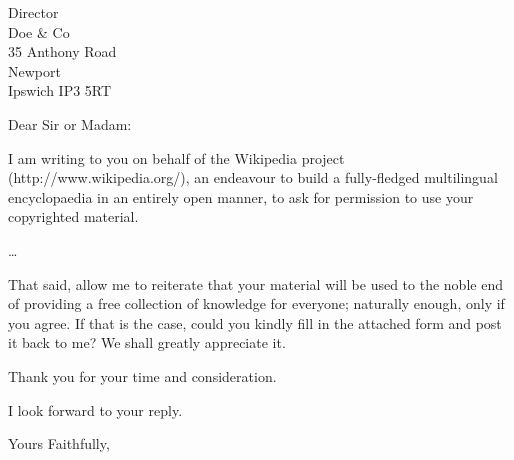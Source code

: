 \documentclass{letter}
\begin{document}
\begin{letter}{Director \\ Doe \& Co \\ 35 Anthony Road
\\ Newport \\ Ipswich IP3 5RT}
\opening{Dear Sir or Madam:}

I am writing to you on behalf of the Wikipedia project (http://www.wikipedia.org/),
an endeavour to build a fully-fledged multilingual encyclopaedia in an entirely
open manner, to ask for permission to use your copyrighted material.

\ldots 

That said, allow me to reiterate that your material will be used to the noble end of
providing a free collection of knowledge for everyone; naturally enough, only if you
agree. If that is the case, could you kindly fill in the attached form and post it
back to me? We shall greatly appreciate it.

Thank you for your time and consideration.

I look forward to your reply.

\closing{\noindent Yours Faithfully,}


\end{letter}
\end{document}
